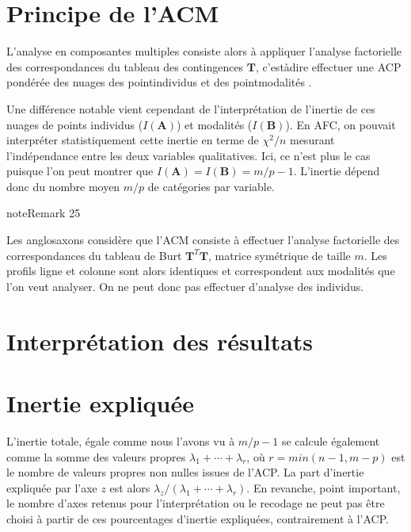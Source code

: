 \documentclass[letterpaper,10pt,english]{jupyterBook}
\begin{document}
\section{Principe de l’ACM}
\label{\detokenize{acm:principe-de-l-acm}}
\sphinxAtStartPar
L’analyse en composantes multiples consiste alors à appliquer l’analyse factorielle des correspondances  du tableau des  contingences \(\mathbf T\), c’est\sphinxhyphen{}à\sphinxhyphen{}dire effectuer une ACP pondérée des nuages des point\sphinxhyphen{}individus et des point\sphinxhyphen{}modalités .

\sphinxAtStartPar
Une différence notable vient cependant de l’interprétation de l’inertie de ces nuages de points  individus (\(I(\mathbf{A})\)) et modalités (\(I(\mathbf{B})\)). En AFC, on pouvait interpréter statistiquement cette inertie en terme de \(\chi^2/n\) mesurant l’indépendance entre les deux variables qualitatives. Ici, ce n’est plus le cas puisque l’on peut montrer que \(I(\mathbf{A}) = I(\mathbf{B})= m/p-1\). L’inertie dépend donc du nombre moyen \(m/p\) de catégories par variable.
\label{acm:remark-2}
\begin{sphinxadmonition}{note}{Remark 25}



\sphinxAtStartPar
Les anglo\sphinxhyphen{}saxons considère que l’ACM consiste à effectuer l’analyse factorielle des correspondances  du tableau de Burt \(\mathbf T^T \mathbf T\), matrice symétrique de taille \(m\). Les profils ligne et colonne sont alors identiques et correspondent aux modalités que l’on veut analyser. On ne peut donc pas effectuer d’analyse des individus.
\end{sphinxadmonition}


\section{Interprétation des résultats}
\label{\detokenize{acm:interpretation-des-resultats}}

\section{Inertie expliquée}
\label{\detokenize{acm:inertie-expliquee}}
\sphinxAtStartPar
L’inertie totale, égale comme nous l’avons vu à \(m/p-1\) se calcule  également comme la somme des valeurs propres \(\lambda_1+\cdots +\lambda_r\), où \(r=min(n-1,m-p)\) est le nombre de valeurs propres non nulles issues de l’ACP. La part d’inertie expliquée par l’axe \(z\) est alors \(\lambda_z/(\lambda_1+\cdots +\lambda_r)\). En revanche, point important, le nombre d’axes retenus pour l’interprétation ou le recodage ne peut pas être choisi à partir de ces pourcentages d’inertie expliquées, contrairement à l’ACP.
\end{document}
